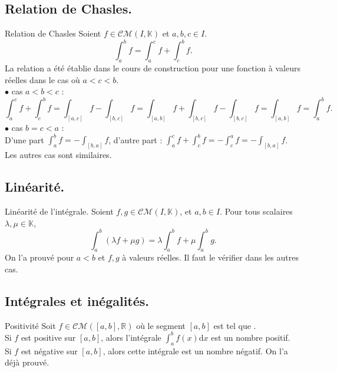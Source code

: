 \documentclass[11pt]{article}
\newcommand*{\K}{\mathbb{K}}
\newcommand*{\R}{\mathbb{R}}
\newcommand*{\CM}{\mathcal{CM}}
\newcommand{\0}{\varnothing}
\renewcommand*{\l}{\lambda}
\newcommand*{\n}{\\[0.2cm]}
\newcommand{\dx}{\textrm{d}x}
\begin{document}
\subsection{Relation de Chasles.}
\begin{prop}{Relation de Chasles}{}
    Soient $f\in\CM(I,\K)$ et $a,b,c\in I$.
    \begin{equation*}
        \int_a^bf=\int_a^cf+\int_c^bf.
    \end{equation*}
    \tcblower
    La relation a été établie dans le cours de construction pour une fonction à valeurs réelles dans le cas où $a<c<b$.\\
    $\bullet$ cas $a<b<c$ :
    \begin{equation*}
        \int_a^cf+\int_c^bf=\int_{[a,c]}f-\int_{[b,c]}f=\int_{[a,b]}f+\int_{[b,c]}f-\int_{[b,c]}f=\int_{[a,b]}f=\int_a^bf.
    \end{equation*}
    $\bullet$ cas $b=c<a$ :\\
    D'une part $\int_a^bf=-\int_{[b,a]}f$, d'autre part : $\int_a^cf+\int_c^bf=-\int_c^af=-\int_[b,a]f$.\n
    Les autres cas sont similaires.
\end{prop}

\subsection{Linéarité.}

\begin{prop}{Linéarité de l'intégrale.}{}
    Soient $f,g\in\CM(I,\K)$, et $a,b\in I$. Pour tous scalaires $\l,\mu\in\K$,
    \begin{equation*}
        \int_a^b(\l f+\mu g) = \l\int_{a}^bf+\mu\int_a^bg.
    \end{equation*}
    \tcblower
    On l'a prouvé pour $a<b$ et $f,g$ à valeurs réelles. Il faut le vérifier dans les autres cas.
\end{prop}

\subsection{Intégrales et inégalités.}
\begin{prop}{Positivité}{}
    Soit $f\in\CM([a,b],\R)$ où le segment $[a,b]$ est tel que .\\
    Si $f$ est positive sur $[a,b]$, alors l'intégrale $\int_a^bf(x)\dx$ est un nombre positif.\\
    Si $f$ est négative sur $[a,b]$, alors cette intégrale est un nombre négatif.
    \tcblower
    On l'a déjà prouvé.
\end{prop}
\end{document}
